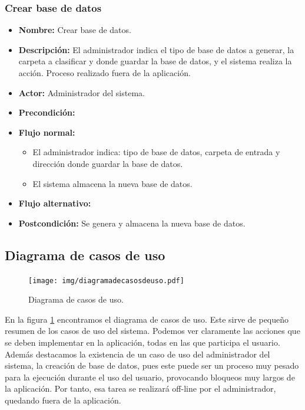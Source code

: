 \subsubsection{Crear base de datos}

\begin{itemize}
\item \textbf{Nombre: }Crear base de datos.
\item \textbf{Descripción: }El administrador indica el tipo de base de datos a generar, la carpeta a clasificar y donde guardar la base de datos, y el sistema realiza la acción. Proceso realizado fuera de la aplicación.
\item \textbf{Actor: }Administrador del sistema.
\item \textbf{Precondición: }
\item \textbf{Flujo normal: }
\begin{itemize}
\item El administrador indica: tipo de base de datos, carpeta de entrada y dirección donde guardar la base de datos.
\item El sistema almacena la nueva base de datos.
\end{itemize}
\item \textbf{Flujo alternativo:}
\item \textbf{Postcondición: } Se genera y almacena la nueva base de datos.
\end{itemize}

\subsection{Diagrama de casos de uso}
\begin{figure}[H]
\begin{center}

\texttt{[image: img/diagramadecasosdeuso.pdf]}
\end{center}

\caption{Diagrama de casos de uso.}
\label{casouso}
\end{figure}

En la figura \ref{casouso} encontramos el diagrama de casos de uso. Este sirve de pequeño resumen de los casos de uso del sistema. Podemos ver claramente las acciones que se deben implementar en la aplicación, todas en las que participa el usuario. Además destacamos la existencia de un caso de uso del administrador del sistema, la creación de base de datos, pues este puede ser un proceso muy pesado para la ejecución durante el uso del usuario, provocando bloqueos muy largos de la aplicación. Por tanto, esa tarea se realizará off-line por el administrador, quedando fuera de la aplicación.\\

